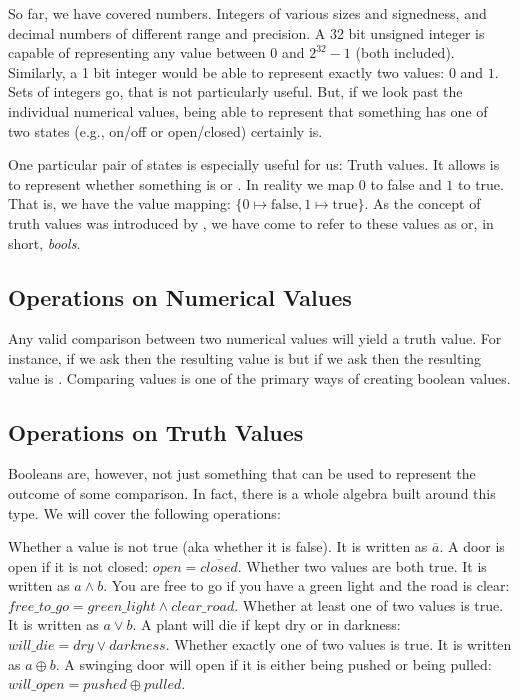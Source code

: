 So far, we have covered numbers. Integers of various sizes and signedness, and decimal numbers of different range and precision. A 32 bit unsigned integer is capable of representing any value between $0$ and $2^{32}-1$ (both included). Similarly, a 1 bit integer would be able to represent exactly two values: $0$ and $1$. Sets of integers go, that is not particularly useful. But, if we look past the individual numerical values, being able to represent that something has one of two states (e.g., on/off or open/closed) certainly is. 

One particular pair of states is especially useful for us: Truth values. It allows is to represent whether something is  or . In reality we map $0$ to false and $1$ to true. That is, we have the value mapping: $\{0 \mapsto \mathrm{false}, 1 \mapsto \mathrm{true}\}$. As the concept of truth values was introduced by , we have come to refer to these values as  or, in short, \textsl{bools}.

\subsection{Operations on Numerical Values}

Any valid comparison between two numerical values will yield a truth value. For instance, if we ask  then the resulting value is  but if we ask  then the resulting value is . Comparing values is one of the primary ways of creating boolean values.

\subsection{Operations on Truth Values}

Booleans are, however, not just something that can be used to represent the outcome of some comparison. In fact, there is a whole algebra built around this type. We will cover the following operations:
\begin{itemize}
   Whether a value is not true (aka whether it is false). It is written as $\overline{a}$. A door is open if it is not closed: $open = \overline{closed}$.
   Whether two values are both true. It is written as $a \wedge b$. You are free to go if you have a green light and the road is clear: $free\_to\_go = green\_light \wedge clear\_road$. 
   Whether at least one of two values is true. It is written as $a \vee b$. A plant will die if kept dry or in darkness: $will\_die = dry \vee darkness$.
   Whether exactly one of two values is true. It is written as $a \oplus b$. A swinging door will open if it is either being pushed or being pulled: $will\_open = pushed \oplus pulled$.
\end{itemize}

